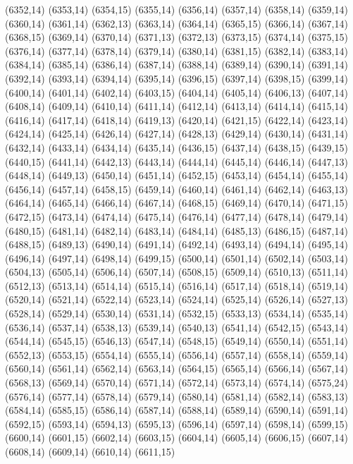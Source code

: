 (6352,14)
(6353,14)
(6354,15)
(6355,14)
(6356,14)
(6357,14)
(6358,14)
(6359,14)
(6360,14)
(6361,14)
(6362,13)
(6363,14)
(6364,14)
(6365,15)
(6366,14)
(6367,14)
(6368,15)
(6369,14)
(6370,14)
(6371,13)
(6372,13)
(6373,15)
(6374,14)
(6375,15)
(6376,14)
(6377,14)
(6378,14)
(6379,14)
(6380,14)
(6381,15)
(6382,14)
(6383,14)
(6384,14)
(6385,14)
(6386,14)
(6387,14)
(6388,14)
(6389,14)
(6390,14)
(6391,14)
(6392,14)
(6393,14)
(6394,14)
(6395,14)
(6396,15)
(6397,14)
(6398,15)
(6399,14)
(6400,14)
(6401,14)
(6402,14)
(6403,15)
(6404,14)
(6405,14)
(6406,13)
(6407,14)
(6408,14)
(6409,14)
(6410,14)
(6411,14)
(6412,14)
(6413,14)
(6414,14)
(6415,14)
(6416,14)
(6417,14)
(6418,14)
(6419,13)
(6420,14)
(6421,15)
(6422,14)
(6423,14)
(6424,14)
(6425,14)
(6426,14)
(6427,14)
(6428,13)
(6429,14)
(6430,14)
(6431,14)
(6432,14)
(6433,14)
(6434,14)
(6435,14)
(6436,15)
(6437,14)
(6438,15)
(6439,15)
(6440,15)
(6441,14)
(6442,13)
(6443,14)
(6444,14)
(6445,14)
(6446,14)
(6447,13)
(6448,14)
(6449,13)
(6450,14)
(6451,14)
(6452,15)
(6453,14)
(6454,14)
(6455,14)
(6456,14)
(6457,14)
(6458,15)
(6459,14)
(6460,14)
(6461,14)
(6462,14)
(6463,13)
(6464,14)
(6465,14)
(6466,14)
(6467,14)
(6468,15)
(6469,14)
(6470,14)
(6471,15)
(6472,15)
(6473,14)
(6474,14)
(6475,14)
(6476,14)
(6477,14)
(6478,14)
(6479,14)
(6480,15)
(6481,14)
(6482,14)
(6483,14)
(6484,14)
(6485,13)
(6486,15)
(6487,14)
(6488,15)
(6489,13)
(6490,14)
(6491,14)
(6492,14)
(6493,14)
(6494,14)
(6495,14)
(6496,14)
(6497,14)
(6498,14)
(6499,15)
(6500,14)
(6501,14)
(6502,14)
(6503,14)
(6504,13)
(6505,14)
(6506,14)
(6507,14)
(6508,15)
(6509,14)
(6510,13)
(6511,14)
(6512,13)
(6513,14)
(6514,14)
(6515,14)
(6516,14)
(6517,14)
(6518,14)
(6519,14)
(6520,14)
(6521,14)
(6522,14)
(6523,14)
(6524,14)
(6525,14)
(6526,14)
(6527,13)
(6528,14)
(6529,14)
(6530,14)
(6531,14)
(6532,15)
(6533,13)
(6534,14)
(6535,14)
(6536,14)
(6537,14)
(6538,13)
(6539,14)
(6540,13)
(6541,14)
(6542,15)
(6543,14)
(6544,14)
(6545,15)
(6546,13)
(6547,14)
(6548,15)
(6549,14)
(6550,14)
(6551,14)
(6552,13)
(6553,15)
(6554,14)
(6555,14)
(6556,14)
(6557,14)
(6558,14)
(6559,14)
(6560,14)
(6561,14)
(6562,14)
(6563,14)
(6564,15)
(6565,14)
(6566,14)
(6567,14)
(6568,13)
(6569,14)
(6570,14)
(6571,14)
(6572,14)
(6573,14)
(6574,14)
(6575,24)
(6576,14)
(6577,14)
(6578,14)
(6579,14)
(6580,14)
(6581,14)
(6582,14)
(6583,13)
(6584,14)
(6585,15)
(6586,14)
(6587,14)
(6588,14)
(6589,14)
(6590,14)
(6591,14)
(6592,15)
(6593,14)
(6594,13)
(6595,13)
(6596,14)
(6597,14)
(6598,14)
(6599,15)
(6600,14)
(6601,15)
(6602,14)
(6603,15)
(6604,14)
(6605,14)
(6606,15)
(6607,14)
(6608,14)
(6609,14)
(6610,14)
(6611,15)
